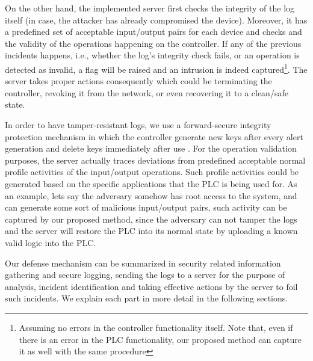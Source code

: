 On the other hand, the implemented server first checks the integrity of the log itself (in case, the attacker has already compromised the device). Moreover, it has a predefined set of acceptable input/output pairs for each device and checks and the validity of the operations happening on the controller. If any of the previous incidents happens, i.e., whether the log's integrity check fails, or an operation is detected as invalid, a flag will be raised and an intrusion is indeed captured\footnote{Assuming no errors in the controller functionality itself. Note that, even if there is an error in the PLC functionality, our proposed method can capture it as well with the same procedure}. The server takes proper actions consequently which could be terminating the controller, revoking it from the network, or even recovering it to a clean/safe state.

In order to have tamper-resistant logs, we use a forward-secure integrity protection mechanism in which the controller generate new keys after every alert generation and delete keys immediately after use \cite{pillarbox}. For the operation validation purposes, the server actually traces deviations from predefined acceptable normal profile activities of the input/output operations. Such profile activities could be generated based on the specific applications that the PLC is being used for. As an example, lets say the adversary somehow has root access to the system, and can generate some sort of malicious input/output pairs, such activity can be captured by our proposed method, since the adversary can not tamper the logs and the server will restore the PLC into its normal state by uploading a known valid logic into the PLC.

Our defense mechanism can be summarized in security related information gathering and secure logging, sending the logs to a server for the purpose of analysis, incident identification and taking effective actions by the server to foil such incidents. We explain each part in more detail in the following sections.

